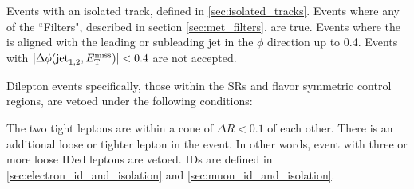     \begin{description}
       Events with an isolated track, defined in \ref{sec:isolated_tracks}.
       Events where any of the ``\MET Filters", described in section \ref{sec:met_filters}, are true.
       Events where the \MET is aligned with the leading or subleading jet in the $\phi$ direction up to 0.4. Events with $\lvert \Delta \phi(\text{jet}_{1,2},E_{\mathrm{T}}^{\text{miss}}) \rvert < 0.4$ are not accepted. 
    \end{description}

    Dilepton events specifically, those within the SRs and flavor symmetric control regions, are vetoed under the following conditions:

      \begin{description}
         The two tight leptons are within a cone of $\Delta R < 0.1$ of each other.
         There is an additional loose or tighter lepton in the event. In other words, event with three or more loose IDed leptons are vetoed. IDs are defined in \ref{sec:electron_id_and_isolation} and \ref{sec:muon_id_and_isolation}. 
      \end{description}


